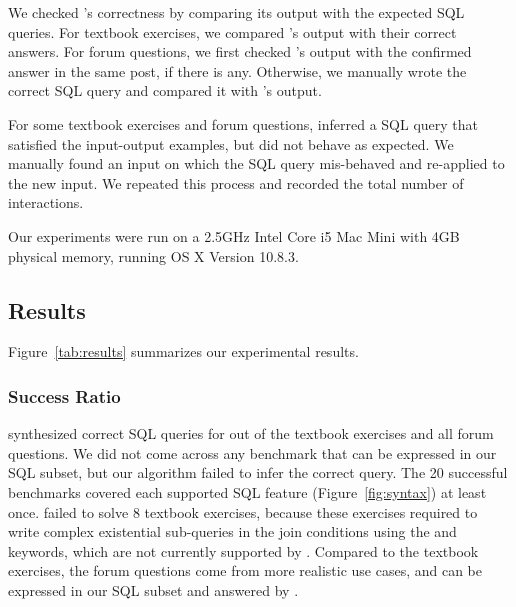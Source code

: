 We checked \ourtool's correctness by comparing its
output with the expected SQL queries.
For textbook exercises, we compared \ourtool's output with
their correct answers. For forum questions, we first
checked \ourtool's output with the confirmed answer
in the same post, if there is any. Otherwise, we
manually wrote the correct SQL query and
compared it with \ourtool's output.

For some textbook exercises and forum questions,
\ourtool inferred a SQL query that satisfied the input-output
examples, but did not behave as expected.
We manually found an input on which the
SQL query mis-behaved and re-applied \ourtool to the new input. We
repeated this process and recorded the total number of
interactions.


Our experiments were run on a 2.5GHz Intel Core i5 Mac Mini
with 4GB physical memory, running OS X Version 10.8.3.





\vspace{-2mm}
\subsection{Results}
\vspace{-1mm}

Figure~\ref{tab:results} summarizes our experimental results.

\subsubsection{Success Ratio}
\label{sec:ratio}


\ourtool synthesized correct SQL queries for \solexnum  out of
the \exnum textbook exercises and 
all \pnum forum questions.
We did not come across any benchmark
that can be expressed in our SQL subset,
but our algorithm failed to infer the correct query.
The 20 successful benchmarks covered each
supported SQL feature (Figure~\ref{fig:syntax}) at least once.
\ourtool failed to solve 8 textbook exercises,
because these exercises required to write
complex existential sub-queries in the join conditions
using the  and  keywords,
which are not currently supported by \ourtool.
Compared to the textbook exercises, the \pnum
forum questions come from more realistic use cases,
and can be expressed in our SQL subset
and answered by \ourtool.



